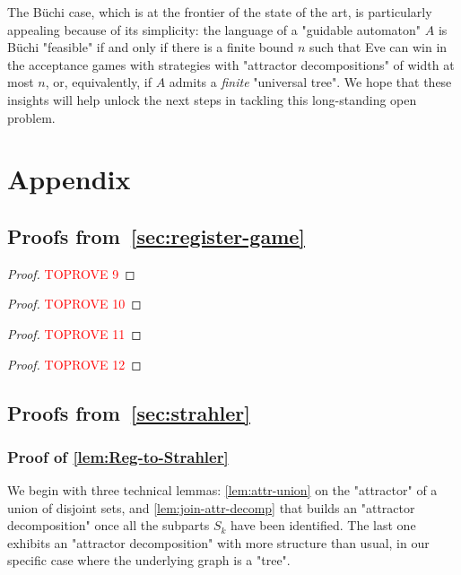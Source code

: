 \documentclass[a4paper,UKenglish,cleveref, autoref, thm-restate]{lipics-v2021}
\newcommand{\A}{{A}}
\begin{document}
The B\"uchi case, which is at the frontier of the state of the art, is particularly appealing because of its simplicity: the language of a "guidable automaton" $\A$ is B\"uchi "feasible" if and only if there is a finite bound $n$ such that Eve can win in the acceptance games with strategies with "attractor decompositions" of width at most $n$, or, equivalently, if $\A$ admits a \textit{finite} "universal tree". We hope that these insights will help unlock the next steps in tackling this long-standing open problem. 


\appendix

\section{Appendix}




\subsection{Proofs from~\cref{sec:register-game}}

\automataComposition*
\begin{proof}\textcolor{red}{TOPROVE 9}\end{proof}

\regRejectsRejecting*

\begin{proof}\textcolor{red}{TOPROVE 10}\end{proof}

\pumping*

\begin{proof}\textcolor{red}{TOPROVE 11}\end{proof}

\guidableNBound*

\begin{proof}\textcolor{red}{TOPROVE 12}\end{proof}


\subsection{Proofs from~\cref{sec:strahler}}
\subsubsection*{Proof of \cref{lem:Reg-to-Strahler}}\label{app:Reg-to-Strahler}


We begin with three technical lemmas: \cref{lem:attr-union} on the "attractor" of a union of disjoint sets, and \cref{lem:join-attr-decomp} that builds an "attractor decomposition" once all the subparts $S_k$ have been identified. The last one exhibits an "attractor decomposition" with more structure than usual, in our specific case where the underlying graph is a "tree".
\end{document}
